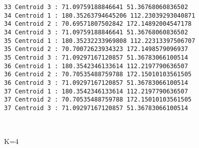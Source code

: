 \documentclass[11pt]{article}
\begin{document}
\begin{Verbatim}[commandchars=\\\{\}]
33 Centroid 3 : 71.09759188846641 51.36768060836502
34 Centroid 1 : 180.35263794645206 112.23039293040871
34 Centroid 2 : 70.69571807502842 172.14892004547178
34 Centroid 3 : 71.09759188846641 51.36768060836502
35 Centroid 1 : 180.35232233969808 112.22313397506707
35 Centroid 2 : 70.70072623934323 172.1498579096937
35 Centroid 3 : 71.09297167120857 51.36783066100514
36 Centroid 1 : 180.3542346133614 112.2197790636507
36 Centroid 2 : 70.70535488759788 172.15010103561505
36 Centroid 3 : 71.09297167120857 51.36783066100514
37 Centroid 1 : 180.3542346133614 112.2197790636507
37 Centroid 2 : 70.70535488759788 172.15010103561505
37 Centroid 3 : 71.09297167120857 51.36783066100514

    \end{Verbatim}

    \begin{center}
    \end{center}
    { \hspace*{\fill} \\}
    
    K=4
\end{document}
